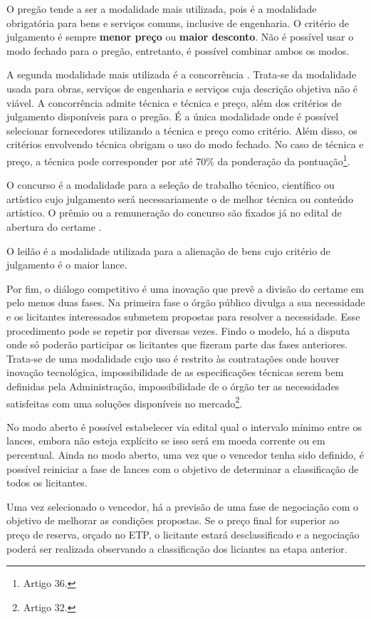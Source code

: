 O pregão tende a ser a modalidade mais utilizada, pois é a modalidade obrigatória para bens e serviços comuns, inclusive de engenharia. O critério de julgamento é sempre \textbf{menor preço} ou \textbf{maior desconto}. Não é possível usar o modo fechado para o pregão, entretanto, é possível combinar ambos os modos.

A segunda modalidade mais utilizada é a concorrência \citet{TCE2023}. Trata-se da modalidade usada para obras, serviços de engenharia e serviços cuja descrição objetiva não é viável. A concorrência admite técnica e técnica e preço, além dos critérios de julgamento disponíveis para o pregão. É a única modalidade onde é possível selecionar fornecedores utilizando a técnica e preço como critério. Além disso, os critérios envolvendo técnica obrigam o uso do modo fechado. No caso de técnica e preço, a técnica pode corresponder por até 70\% da ponderação da pontuação\footnote{Artigo 36.}.

O concurso é a modalidade para a seleção de trabalho técnico, científico ou artístico cujo julgamento será necessariamente o de melhor técnica ou conteúdo artístico. O prêmio ou a remuneração do concurso são fixados já no edital de abertura do certame \citet{TCE2022}.

O leilão é a modalidade utilizada para a alienação de bens cujo critério de julgamento é o maior lance.

Por fim, o diálogo competitivo é uma inovação que prevê a divisão do certame em pelo menos duas fases. Na primeira fase o órgão público divulga a sua necessidade e os licitantes interessados submetem propostas para resolver a necessidade. Esse procedimento pode se repetir por diversas vezes. Findo o modelo, há a disputa onde só poderão participar os licitantes que fizeram parte das fases anteriores. Trata-se de uma modalidade cujo uso é restrito às contratações onde houver inovação tecnológica, impossibilidade de as especificações técnicas serem bem definidas pela Administração, impossibilidade de o órgão ter as necessidades satisfeitas com uma soluções disponíveis no mercado\footnote{Artigo 32.}.

No modo aberto é possível estabelecer via edital qual o intervalo mínimo entre os lances, embora não esteja explícito se isso será em moeda corrente ou em percentual. Ainda no modo aberto, uma vez que o vencedor tenha sido definido, é possível reiniciar a fase de lances com o objetivo de determinar a classificação de todos os licitantes.

Uma vez selecionado o vencedor, há a previsão de uma fase de negociação com o objetivo de melhorar as condições propostas. Se o preço final for superior ao preço de reserva, orçado no ETP, o licitante estará desclassificado e a negociação poderá ser realizada observando a classificação dos liciantes na etapa anterior.

